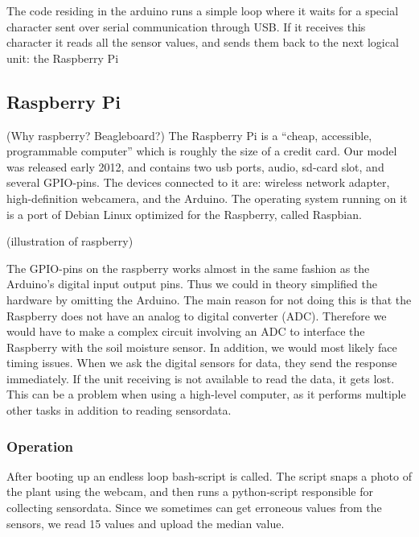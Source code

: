 The code residing in the arduino runs a simple loop where it waits for a special character sent over serial communication through USB. If it receives this character it reads all the sensor values, and sends them back to the next logical unit: the Raspberry Pi

\subsection{Raspberry Pi}
(Why raspberry? Beagleboard?)
The Raspberry Pi is a “cheap, accessible, programmable computer” \citep{raspberrypi} which is roughly the size of a credit card. Our model was released early 2012, and contains two usb ports, audio, sd-card slot, and several GPIO-pins. The devices connected to it are: wireless network adapter, high-definition webcamera, and the Arduino. The operating system running on it is a port of Debian Linux optimized for the Raspberry, called Raspbian. 

(illustration of raspberry)

The GPIO-pins on the raspberry works almost in the same fashion as the Arduino’s digital input output pins. Thus we could in theory simplified the hardware by omitting the Arduino. The main reason for not doing this is that the Raspberry does not have an analog to digital converter (ADC). Therefore we would have to make a complex circuit involving an ADC to interface the Raspberry with the soil moisture sensor. In addition, we would most likely face timing issues. When we ask the digital sensors for data, they send the response immediately. If the unit receiving is not available to read the data, it gets lost. This can be a problem when using a high-level computer, as it performs multiple other tasks in addition to reading sensordata. 

\subsubsection{Operation}
After booting up an endless loop bash-script is called. The script snaps a photo of the plant using the webcam, and then runs a python-script responsible for collecting sensordata. Since we sometimes can get erroneous values from the sensors, we read 15 values and upload the median value.

